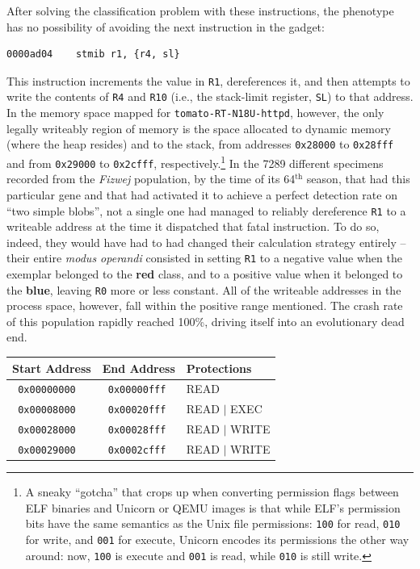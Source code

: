 \documentclass[12pt,glossary]{dalthesis}
\begin{document}
After solving the classification problem with these instructions, the phenotype
has no possibility of avoiding the next instruction in the gadget:
\lstset{language=asm,label= ,caption= ,captionpos=b,numbers=none}
\begin{lstlisting}
0000ad04    stmib r1, {r4, sl}
\end{lstlisting}
This instruction increments the value in \texttt{R1}, dereferences it, and then attempts to write
the contents of \texttt{R4} and \texttt{R10} (i.e., the stack-limit register, \texttt{SL}) to that
address. In the memory space mapped for \texttt{tomato-RT-N18U-httpd}, however, the
only legally writeably region of memory is the space allocated to dynamic memory
(where the heap resides) and to the stack,
from addresses \texttt{0x28000} to \texttt{0x28fff} and from \texttt{0x29000} to \texttt{0x2cfff}, respectively.\footnote{A sneaky ``gotcha'' that crops up when converting permission flags between ELF
  binaries and Unicorn or QEMU images is that while ELF's permission bits have
  the same semantics as the Unix file permissions: \texttt{100} for read, \texttt{010} for write,
  and \texttt{001} for execute, Unicorn encodes its permissions the other way around:
  now, \texttt{100} is execute and \texttt{001} is read, while \texttt{010} is still write.}
In the 7289 different specimens recorded
from the \emph{Fizwej} population, by the time of its 64\(^{\text{th}}\) season, that had this
particular gene and that had activated it to achieve a perfect detection rate 
on ``two simple blobs'', not a single one had managed to reliably dereference
\texttt{R1} to a writeable address at the time it dispatched that fatal instruction. 
To do so, indeed, they would have had to had changed their calculation strategy
entirely -- their entire \emph{modus operandi} consisted in setting \texttt{R1} to a negative
value when the exemplar belonged to the \textbf{red} class, and to a positive value when
it belonged to the \textbf{blue}, leaving \texttt{R0} more or less constant. All of the writeable
addresses in the process space, however, fall within the positive range mentioned.
The crash rate of this population rapidly reached 100\%, driving itself into an
evolutionary dead end. 


\begin{center}
\begin{tabular}{lll}
Start Address & End Address & Protections\\
\hline
\texttt{ 0x00000000} & \texttt{ 0x00000fff} & READ\\
\texttt{ 0x00008000} & \texttt{ 0x00020fff} & READ \(\vert{}\) EXEC\\
\texttt{ 0x00028000} & \texttt{ 0x00028fff} & READ \(\vert{}\) WRITE\\
\texttt{ 0x00029000} & \texttt{ 0x0002cfff} & READ \(\vert{}\) WRITE\\
\hline
\end{tabular}
\end{center}
\end{document}
